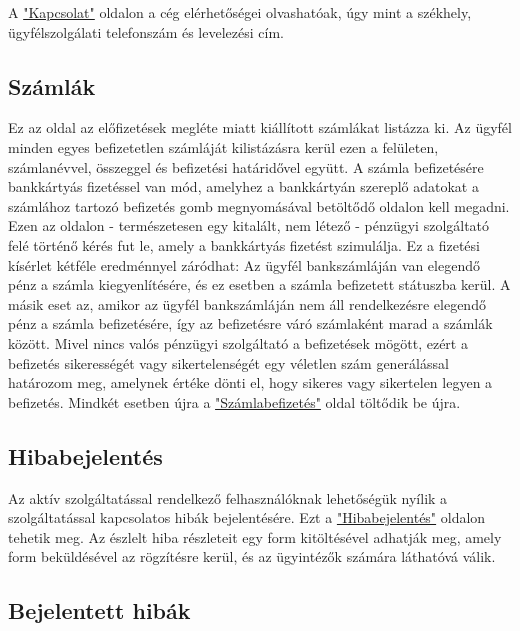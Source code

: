 \documentclass[centeredchapter]{thesis-ekf}
\theoremstyle{definition}
\theoremstyle{remark}
\begin{document}
A \hyperlink{leiras-kapcsolat}{"Kapcsolat"} oldalon a cég elérhetőségei olvashatóak, úgy mint a székhely, ügyfélszolgálati telefonszám és levelezési cím.

\subsection{Számlák}\hypertarget{leiras-szamla}{}

Ez az oldal az előfizetések megléte miatt kiállított számlákat listázza ki. Az ügyfél minden egyes befizetetlen számláját kilistázásra kerül ezen a felületen, számlanévvel, összeggel és befizetési határidővel együtt. A számla befizetésére bankkártyás fizetéssel van mód, amelyhez a bankkártyán szereplő adatokat a számlához tartozó befizetés gomb megnyomásával betöltődő oldalon kell megadni. Ezen az oldalon - természetesen egy kitalált, nem létező - pénzügyi szolgáltató felé történő kérés fut le, amely a bankkártyás fizetést szimulálja. Ez a fizetési kísérlet kétféle eredménnyel záródhat:
 Az ügyfél bankszámláján van elegendő pénz a számla kiegyenlítésére, és ez esetben a számla befizetett státuszba kerül.
 A másik eset az, amikor az ügyfél bankszámláján nem áll rendelkezésre elegendő pénz a számla befizetésére, így az befizetésre váró számlaként marad a számlák között.
 Mivel nincs valós pénzügyi szolgáltató a befizetések mögött, ezért a befizetés sikerességét vagy sikertelenségét egy véletlen szám generálással határozom meg, amelynek értéke dönti el, hogy sikeres vagy sikertelen legyen a befizetés. Mindkét esetben újra a \hyperlink{leiras-szamla}{"Számlabefizetés"} oldal töltődik be újra.

\subsection{Hibabejelentés}\hypertarget{leiras-bejelentes}{}

Az aktív szolgáltatással rendelkező felhasználóknak lehetőségük nyílik a szolgáltatással kapcsolatos hibák bejelentésére. Ezt a \hyperlink{leiras-bejelentes}{"Hibabejelentés"} oldalon tehetik meg.
Az észlelt hiba részleteit egy form kitöltésével adhatják meg, amely form beküldésével az rögzítésre kerül, és az ügyintézők számára láthatóvá válik.

\subsection{Bejelentett hibák}\hypertarget{leiras-bejelentetthibak}{}
\end{document}
